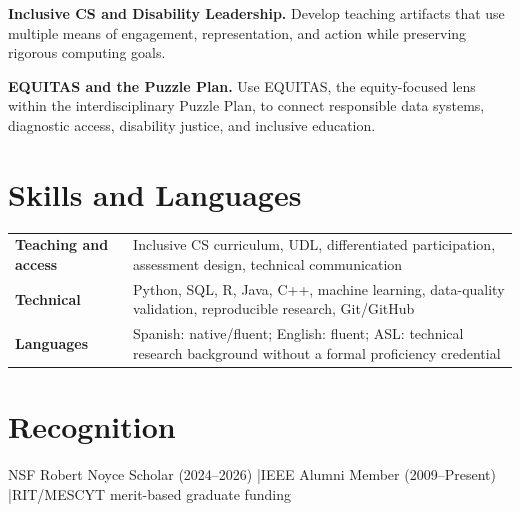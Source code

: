 \documentclass[10pt,letterpaper]{article}
\begin{document}
\textbf{Inclusive CS and Disability Leadership.}
Develop teaching artifacts that use multiple means of engagement,
representation, and action while preserving rigorous computing goals.

\textbf{EQUITAS and the Puzzle Plan.}
Use EQUITAS, the equity-focused lens within the interdisciplinary Puzzle Plan,
to connect responsible data systems, diagnostic access, disability justice,
and inclusive education.

\section*{Skills and Languages}
\begin{tabularx}{\textwidth}{@{}>{\bfseries}l X@{}}
Teaching and access & Inclusive CS curriculum, UDL, differentiated participation, assessment design, technical communication\\
Technical & Python, SQL, R, Java, C++, machine learning, data-quality validation, reproducible research, Git/GitHub\\
Languages & Spanish: native/fluent; English: fluent; ASL: technical research background without a formal proficiency credential\\
\end{tabularx}

\section*{Recognition}
NSF Robert Noyce Scholar (2024--2026)
\enspace|\enspace IEEE Alumni Member (2009--Present)
\enspace|\enspace RIT/MESCYT merit-based graduate funding
\end{document}
